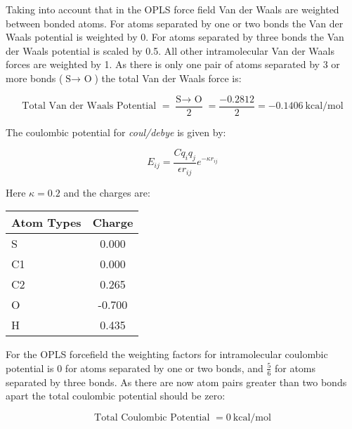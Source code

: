 \documentclass{article}\usepackage[]{graphicx}\usepackage[]{color}
\begin{document}
Taking into account that in the OPLS force field Van der Waals are weighted between bonded atoms.  For atoms separated by one or two bonds the Van der Waals potential is weighted by 0.  For atoms separated by three bonds the Van der Waals potential is scaled by 0.5.  All other intramolecular Van der Waals forces are weighted by 1.  As there is only one pair of atoms separated by 3 or more bonds ($\text{S$\rightarrow$ O}$) the total Van der Waals force is:

$$\boxed{\text{Total Van der Waals Potential }=\frac{\text{S$\rightarrow$ O}}{2}=\frac{-0.2812}{2}=-0.1406\ \text{kcal/mol}}$$

The coulombic potential for \textit{coul/debye} is given by:

$$E_{ij} =  \frac{Cq_i q_j}{\epsilon r_{ij}}e^{-\kappa r_{ij}}$$

Here $\kappa=0.2$ and the charges are:

\begin{table}[ht]
\centering
\begin{tabular}{|l|c|}
  \hline
Atom Types & Charge \\ 
  \hline
S & 0.000 \\ 
  C1 & 0.000 \\ 
  C2 & 0.265 \\ 
  O & -0.700 \\ 
  H & 0.435 \\ 
   \hline
\end{tabular}
\end{table}


For the OPLS forcefield the weighting factors for intramolecular coulombic potential is 0 for atoms separated by one or two bonds, and $\frac{5}{6}$ for atoms separated by three bonds.  As there are now atom pairs greater than two bonds apart the total coulombic potential should be zero:

$$\boxed{\text{Total Coulombic Potential }=0\ \text{kcal/mol}}$$
\end{document}
